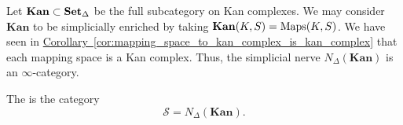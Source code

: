 \begin{example}
	Let $\mathbf{Kan} \subset \operatorname{\mathbf{Set}_{\Delta}}$ be the full subcategory on Kan complexes. We may consider $\mathbf{Kan}$ to be simplicially enriched by taking $\mathbf{Kan}(K, S) = \operatorname{Maps}(K, S)$. We have seen in \hyperref[cor:mapping_space_to_kan_complex_is_kan_complex]{Corollary~\ref*{cor:mapping_space_to_kan_complex_is_kan_complex}} that each mapping space is a Kan complex. Thus, the simplicial nerve $N_{\Delta}(\textbf{Kan})$ is an $\infty$-category.
\end{example}

\begin{definition}
	\label{def:category_of_spaces}
	The  is the category
	\begin{equation*}
	\mathcal{S} = N_{\Delta}(\textbf{Kan}).
	\end{equation*}
\end{definition}










